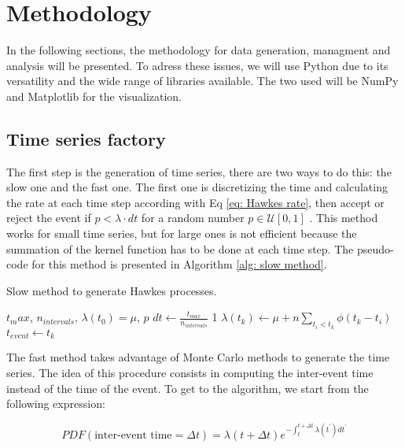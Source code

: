 \chapter{Methodology}\label{ch:metodologia}

In the following sections, the methodology for data generation, managment and analysis will be presented. To adress these issues, we will use Python \cite{McKinney,VanderPlas} due to 
its versatility and the wide range of libraries available. The two used will be NumPy \cite{numpy} and Matplotlib \cite{matplotlib} for the visualization.
 
\section{Time series factory}\label{sec:time_series_factory}

The first step is the generation of time series, there are two ways to do this: the slow one and the fast one. The first one is discretizing the time and calculating the rate at each time step
according with Eq \ref{eq: Hawkes rate}, then accept or reject the event if $p<\lambda \cdot dt$ for a random number $p\in \mathcal{U}[0,1]$ . 
This method works for small time series, but for large ones is not efficient because the summation of the kernel function has to be done at each time step. The pseudo-code for this method is
presented in Algorithm \ref{alg: slow method}.

\begin{algorithm}
    \caption{Slow method to generate Hawkes processes.}\label{alg: slow method}
    \begin{algorithmic}
        \Require $t_max$, $n_{intervals}$, $\lambda(t_0)=\mu$, $p$
        \State $dt \gets \frac{t_{max}}{n_{intervals}}$
        1
            \State $\lambda(t_k) \gets \mu + n\sum_{t_i<t_k}\phi(t_k-t_i)$ 
                \State $t_{event} \gets t_k$
            \EndIf
        \EndFor
        \end{algorithmic}
\end{algorithm}

The fast method takes advantage of Monte Carlo methods \cite{barbu2020monte} to generate the time series. The idea of this procedure consists in computing the inter-event time instead 
of the time of the event. To get to the algorithm, we start from the following expression:

\begin{equation}
    PDF(\text{inter-event time}=\Delta t) = \lambda(t+\Delta t) e^{-\int_t^{t+\Delta t}\lambda(t^\prime)dt^\prime} 
    \label{eq: inter-event time PDF}
\end{equation}

